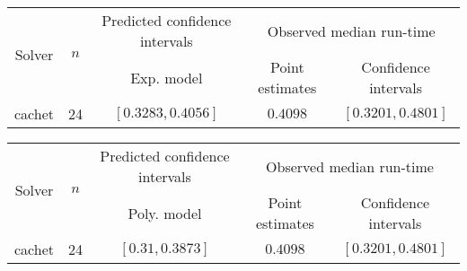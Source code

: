 \begin{tabular}{ccccc}
\hline 
\multirow{2}{*}{Solver} & \multirow{2}{*}{$n$} & Predicted confidence intervals & \multicolumn{2}{c}{Observed median  run-time}\tabularnewline
 &  & Exp. model  & Point estimates  & Confidence intervals\tabularnewline
\hline 
\hline 
\multirow{0}{*}{cachet} & 24 & $\mathbf{\left[0.3283,0.4056\right]}$ & $0.4098$ & $\left[0.3201,0.4801\right]$ \tabularnewline 
\hline 
\end{tabular} 

\begin{tabular}{ccccc}
\hline 
\multirow{2}{*}{Solver} & \multirow{2}{*}{$n$} & Predicted confidence intervals & \multicolumn{2}{c}{Observed median  run-time}\tabularnewline
 &  & Poly. model  & Point estimates  & Confidence intervals\tabularnewline
\hline 
\hline 
\multirow{0}{*}{cachet} & 24 & $\mathbf{\left[0.31,0.3873\right]}$ & $0.4098$ & $\left[0.3201,0.4801\right]$ \tabularnewline 
\hline 
\end{tabular} 


